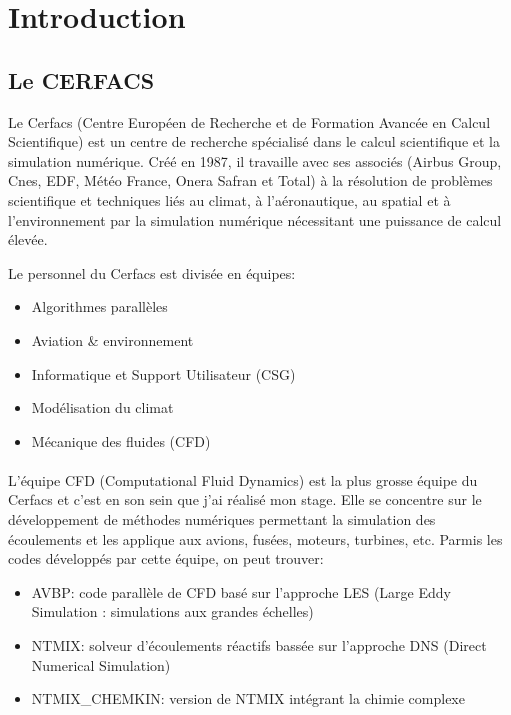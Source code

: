 \section*{Introduction}
\subsection*{Le CERFACS}\label{sec:intro}

Le Cerfacs (Centre Européen de Recherche et de Formation Avancée en Calcul Scientifique) est un centre de recherche spécialisé dans le calcul scientifique et la simulation numérique. Créé en 1987, il travaille avec ses associés (Airbus Group, Cnes, EDF, Météo France, Onera Safran et Total) à la résolution de problèmes scientifique et techniques liés au climat, à l'aéronautique, au spatial et à l'environnement par la simulation numérique nécessitant une puissance de calcul élevée.


Le personnel du Cerfacs est divisée en équipes:
\begin{itemize}
\item Algorithmes parallèles
\item Aviation \& environnement
\item Informatique et Support Utilisateur (CSG)
\item Modélisation du climat
\item Mécanique des fluides (CFD)
\end{itemize}

\paragraph{}L'équipe CFD (Computational Fluid Dynamics) est la plus grosse équipe du Cerfacs et c'est en son sein que j'ai réalisé mon stage. Elle se concentre sur le développement de méthodes numériques permettant la simulation des écoulements et les applique aux avions, fusées, moteurs, turbines, etc. Parmis les codes développés par cette équipe, on peut trouver\cite{cerfacs}:
\begin{itemize}
\item AVBP: code parallèle de CFD basé sur l'approche LES (Large Eddy Simulation : simulations aux grandes échelles)
\item NTMIX: solveur d'écoulements réactifs bassée sur l'approche DNS (Direct Numerical Simulation)
\item NTMIX\_CHEMKIN: version de NTMIX intégrant la chimie complexe 
\end{itemize}


